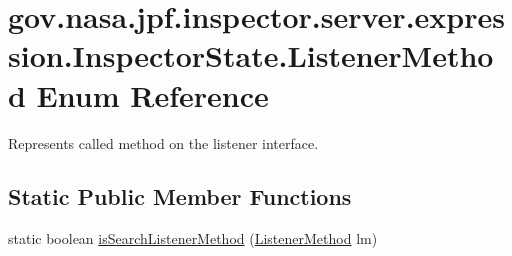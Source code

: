\hypertarget{enumgov_1_1nasa_1_1jpf_1_1inspector_1_1server_1_1expression_1_1_inspector_state_1_1_listener_method}{}\section{gov.\+nasa.\+jpf.\+inspector.\+server.\+expression.\+Inspector\+State.\+Listener\+Method Enum Reference}
\label{enumgov_1_1nasa_1_1jpf_1_1inspector_1_1server_1_1expression_1_1_inspector_state_1_1_listener_method}


Represents called method on the listener interface.  


\subsection*{Static Public Member Functions}
\begin{DoxyCompactItemize}
\item 
static boolean \hyperlink{enumgov_1_1nasa_1_1jpf_1_1inspector_1_1server_1_1expression_1_1_inspector_state_1_1_listener_method_a1274d4c1a9ffff79775b2ffabe2983d7}{is\+Search\+Listener\+Method} (\hyperlink{enumgov_1_1nasa_1_1jpf_1_1inspector_1_1server_1_1expression_1_1_inspector_state_1_1_listener_method}{Listener\+Method} lm)
\end{DoxyCompactItemize}
